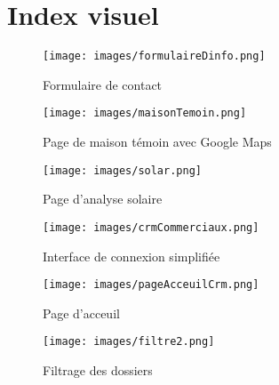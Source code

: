 \section*{Index visuel}

\begin{figure}[H]
    \begin{minipage}[t]{0.6\textwidth}
        \centering
        \texttt{[image: images/formulaireDinfo.png]}
    \end{minipage}
    \begin{minipage}[t]{0.6\textwidth}
        \caption*{Formulaire de contact}
    \end{minipage}
    \vspace{1em}
    \begin{minipage}[t]{0.6\textwidth}
        \centering
        \texttt{[image: images/maisonTemoin.png]}
    \end{minipage}
    \begin{minipage}[t]{0.6\textwidth}
        \caption*{Page de maison témoin avec Google Maps}
    \end{minipage}
    \vspace{1em}
    \begin{minipage}[t]{0.6\textwidth}
        \centering
        \texttt{[image: images/solar.png]}
    \end{minipage}
    \begin{minipage}[t]{0.6\textwidth}
        \caption*{Page d’analyse solaire}
    \end{minipage}
\end{figure}
\newpage

\begin{figure}[H]
    \begin{minipage}[t]{0.6\textwidth}
        \centering
        \texttt{[image: images/crmCommerciaux.png]}
    \end{minipage}
    \begin{minipage}[t]{0.6\textwidth}
        \caption*{Interface de connexion simplifiée}
    \end{minipage}
    \vspace{1em}
    \begin{minipage}[t]{0.6\textwidth}
        \centering
        \texttt{[image: images/pageAcceuilCrm.png]}
    \end{minipage}
    \begin{minipage}[t]{0.6\textwidth}
        \caption*{Page d'acceuil}
    \end{minipage}
    \vspace{1em}
    \begin{minipage}[t]{0.6\textwidth}
        \centering
        \texttt{[image: images/filtre2.png]}
    \end{minipage}
    \begin{minipage}[t]{0.6\textwidth}
        \caption*{Filtrage des dossiers}
    \end{minipage}
\end{figure}
\newpage

